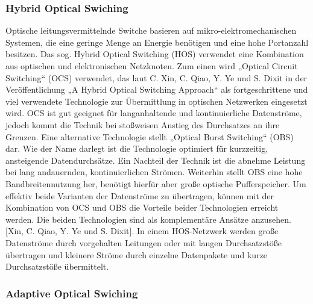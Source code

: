 \subsubsection{Hybrid Optical Swiching}
Optische leitungsvermittelnde Switche basieren auf mikro-elektromechanischen Systemen, die eine geringe Menge an Energie benötigen und eine hohe Portanzahl besitzen. Das sog. Hybrid Optical Switching (HOS) verwendet eine Kombination aus optischen und elektronischen Netzknoten. Zum einen wird „Optical Circuit Switching“ (OCS) verwendet, das laut C. Xin, C. Qiao, Y. Ye und S. Dixit in der Veröffentlichung „A Hybrid Optical Switching Approach“ als fortgeschrittene und viel verwendete Technologie zur Übermittlung in optischen Netzwerken eingesetzt wird. OCS ist gut geeignet für langanhaltende und kontinuierliche Datenströme, jedoch kommt die Technik bei stoßweisen Anstieg des Durchsatzes an ihre Grenzen. Eine alternative Technologie stellt „Optical Burst Switching“ (OBS) dar. Wie der Name darlegt ist die Technologie optimiert für kurzzeitig, ansteigende Datendurchsätze. Ein Nachteil der Technik ist die abnehme Leistung bei lang andauernden, kontinuierlichen Strömen. Weiterhin stellt OBS eine hohe Bandbreitennutzung her, benötigt hierfür aber große optische Pufferspeicher. Um effektiv beide Varianten der Datenströme zu übertragen, können mit der Kombination von OCS und OBS die Vorteile beider Technologien erreicht werden. Die beiden Technologien sind als komplementäre Ansätze anzusehen. [Xin, C. Qiao, Y. Ye und S. Dixit]. In einem HOS-Netzwerk werden große Datenströme durch vorgehalten Leitungen oder mit langen Durchsatzstöße übertragen und kleinere Ströme durch einzelne Datenpakete und kurze Durchsatzstöße übermittelt.

\subsubsection{Adaptive Optical Swiching}

